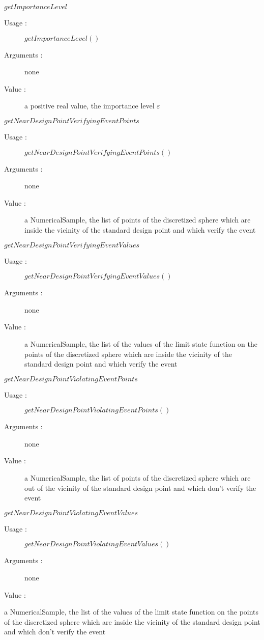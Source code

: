\begin{description}
\begin{description}
  \item $getImportanceLevel$
    \begin{description}
    \item[Usage :] $getImportanceLevel()$
    \item[Arguments :] none
    \item[Value :]  a positive real value, the importance level $\varepsilon$
    \end{description}
    \bigskip

  \item $getNearDesignPointVerifyingEventPoints$
    \begin{description}
    \item[Usage :] $getNearDesignPointVerifyingEventPoints()$
    \item[Arguments :] none
    \item[Value :]   a NumericalSample, the list of points of the discretized sphere which are inside the vicinity of the standard design point and which verify the event
    \end{description}
    \bigskip

  \item $getNearDesignPointVerifyingEventValues$
    \begin{description}
    \item[Usage :] $getNearDesignPointVerifyingEventValues()$
    \item[Arguments :] none
    \item[Value :]   a NumericalSample, the list of the values of the limit state function on the points of the discretized sphere which are inside the vicinity of the standard design point and which verify the event
    \end{description}
    \bigskip

  \item $getNearDesignPointViolatingEventPoints$
    \begin{description}
    \item[Usage :] $getNearDesignPointViolatingEventPoints()$
    \item[Arguments :] none
    \item[Value :]   a NumericalSample, the list of points of the discretized sphere which are out of the vicinity of the standard design point and which don't verify the event
    \end{description}
    \bigskip

  \item $getNearDesignPointViolatingEventValues$
    \begin{description}
    \item[Usage :] $getNearDesignPointViolatingEventValues()$
    \item[Arguments :] none
    \item[Value :]
    \end{description} a NumericalSample, the list of the values of the limit state function on the points of the discretized sphere which are inside the vicinity of the standard design point and which don't verify the event
    \bigskip


\end{description}
\end{description}
